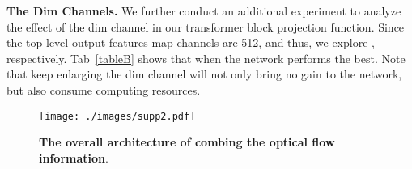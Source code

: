 \documentclass[journal]{IEEEtran}
\begin{document}
\begin{table}[!bt]
    \centering
        \caption{Analysis of the dim channel in transformer  projection function.}\label{tableB}
\end{table}


\noindent \textbf{The Dim Channels.} We further conduct an additional experiment to analyze the effect of the dim channel in our transformer block projection function. Since the top-level output features map channels are 512, and thus, we explore , respectively. Tab~\ref{tableB} shows that when  the network performs the best. Note that keep enlarging the dim channel will not only bring no gain to the network, but also consume computing resources.

\vspace{1ex}

\begin{figure*}[t]
		\begin{center}
			\centering
			\texttt{[image: ./images/supp2.pdf]}
		\end{center}
		\caption{\textbf{The overall architecture of combing the optical flow information}.}
		\label{figB}
\end{figure*}
\end{document}
